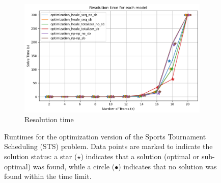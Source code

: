 \begin{figure}[H]
    \centering
    \begin{subfigure}{0.75\linewidth}
        \centering
        \includegraphics[width=\linewidth]{imgs/output.png}
        \caption{Resolution time}
    \end{subfigure}
    \caption{Runtimes for the optimization version of the Sports Tournament Scheduling (STS) problem. Data points are marked to indicate the solution status: a star ($\star$) indicates that a solution (optimal or sub-optimal) was found, while a circle ($\bullet$) indicates that no solution was found within the time limit.}
\end{figure}








